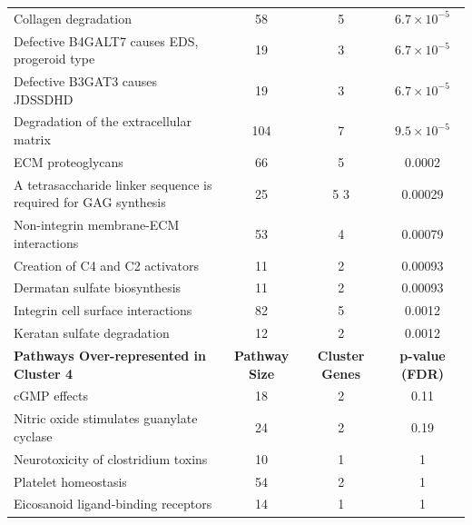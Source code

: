 \begin{table}[!hp]
{\begin{threeparttable}
\begin{tabular}{lccc}
  \rowcolor{Cluster_Orange!15}
  Collagen degradation &  58 &   5 & $6.7 \times 10^{-5}$ \\ 
  \rowcolor{Cluster_Orange!20}
  Defective B4GALT7 causes EDS, progeroid type &  19 &   3 & $6.7 \times 10^{-5}$ \\ 
  \rowcolor{Cluster_Orange!15}
  Defective B3GAT3 causes JDSSDHD &  19 &   3 & $6.7 \times 10^{-5}$ \\ 
  \rowcolor{Cluster_Orange!20}
  Degradation of the extracellular matrix & 104 &   7 & $9.5 \times 10^{-5}$ \\ 
  \rowcolor{Cluster_Orange!15}
  ECM proteoglycans &  66 &   5 & 0.0002 \\ 
  \rowcolor{Cluster_Orange!20}
  A tetrasaccharide linker sequence is required for GAG synthesis &  25 & 5 3 & 0.00029 \\ 
  \rowcolor{Cluster_Orange!15}
  Non-integrin membrane-ECM interactions &  53 &   4 & 0.00079 \\ 
  \rowcolor{Cluster_Orange!20}
  Creation of C4 and C2 activators &  11 &   2 & 0.00093 \\ 
  \rowcolor{Cluster_Orange!15}
  Dermatan sulfate biosynthesis &  11 &   2 & 0.00093 \\ 
  \rowcolor{Cluster_Orange!20}
  Integrin cell surface interactions &  82 &   5 & 0.0012 \\ 
  \rowcolor{Cluster_Orange!15}
  Keratan sulfate degradation &  12 &   2 & 0.0012 \\ 
  \hline
  \cellcolor{white} \large{\textbf{Pathways Over-represented in Cluster 4}} & \large{\textbf{Pathway Size}} & \large{\textbf{Cluster Genes}} & \large{\textbf{p-value (\gls{FDR})}} \\ %
  \hline
  \rowcolor{Cluster_Red!20}
  cGMP effects &  18 &   2 & 0.11 \\ 
  \rowcolor{Cluster_Red!15}
  Nitric oxide stimulates guanylate cyclase &  24 &   2 & 0.19 \\ 
  \rowcolor{Cluster_Red!20}
  Neurotoxicity of clostridium toxins &  10 &   1 &   1 \\ 
  \rowcolor{Cluster_Red!15}
  Platelet homeostasis &  54 &   2 &   1 \\ 
  \rowcolor{Cluster_Red!20}
  Eicosanoid ligand-binding receptors &  14 &   1 &   1 \\ 

\end{tabular}
\end{threeparttable}}
\end{table}

